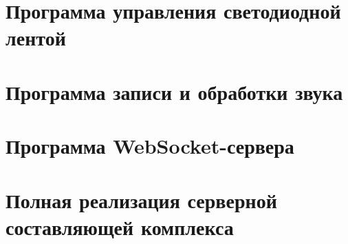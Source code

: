 \section{Программа управления светодиодной лентой}



\section{Программа записи и обработки звука}



\section{Программа WebSocket-сервера}



\section{Полная реализация серверной составляющей комплекса}


